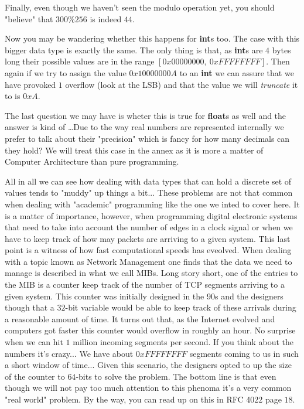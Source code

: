 \documentclass[12pt]{book}
\begin{document}
            Finally, even though we haven't seen the modulo operation yet, you should "believe" that $300 \% 256$ is indeed $44$.

            Now you may be wandering whether this happens for \textbf{int}s too. The case with this bigger data type is exactly the same. The only thing is that, as \textbf{int}s are $4$ bytes long their possible values are in the range $[0x00000000,\ 0xFFFFFFFF]$. Then again if we try to assign the value $0x10000000A$ to an \textbf{int} we can assure that we have provoked $1$ overflow (look at the LSB) and that the value we will \textit{truncate} it to is $0xA$.

            The last question we may have is wheter this is true for \textbf{float}s as well and the answer is kind of \dots Due to the way real numbers are represented internally we prefer to talk about their "precision" which is fancy for how many decimals can they hold? We will treat this case in the annex as it is more a matter of Computer Architecture than pure programming.

            All in all we can see how dealing with data types that can hold a discrete set of values tends to "muddy" up things a bit... These problems are not that common when dealing with "academic" programming like the one we inted to cover here. It is a matter of importance, however, when programming digital electronic systems that need to take into account the number of edges in a clock signal or when we have to keep track of how may packets are arriving to a given system. This last point is a witness of how fast computational speeds has eveolved. When dealing with a topic known as Network Management one finds that the data we need to manage is described in what we call MIBs. Long story short, one of the entries to the MIB is a counter keep track of the number of TCP segments arriving to a given system. This counter was initially designed in the 90s and the designers though that a $32$-bit variable would be able to keep track of these arrivals during a reasonable amount of time. It turns out that, as the Internet evolved and computers got faster this counter would overflow in roughly an hour. No surprise when we can hit $1$ million incoming segments per second. If you think about the numbers it's crazy... We have about $0xFFFFFFFF$ segments coming to us in such a short window of time... Given this scenario, the designers opted to up the size of the counter to $64$-bits to solve the problem. The bottom line is that even though we will not pay too much attention to this phenoma it's a very common "real world" problem. By the way, you can read up on this in RFC 4022 page $18$.
\end{document}
